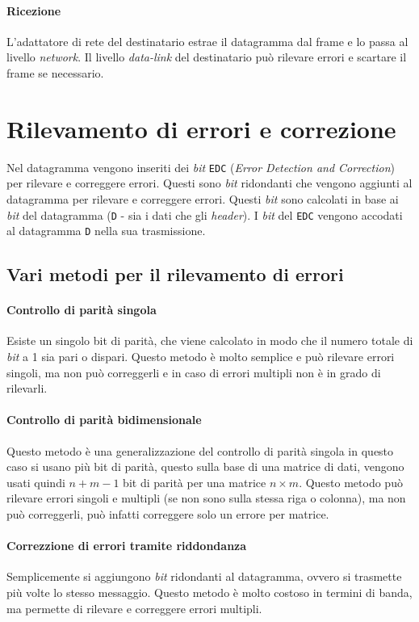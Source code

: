         \paragraph{Ricezione} L'adattatore di rete del destinatario estrae il datagramma dal frame e lo passa al livello \textit{network}. Il livello \textit{data-link} del destinatario può rilevare errori e scartare il frame se necessario.
\section{Rilevamento di errori e correzione}
    Nel datagramma vengono inseriti dei \textit{bit} \texttt{EDC} (\textit{Error Detection and Correction}) per rilevare e correggere errori. Questi sono \textit{bit} ridondanti che vengono aggiunti al datagramma per rilevare e correggere errori. Questi \textit{bit} sono calcolati in base ai \textit{bit} del datagramma (\texttt{D} - sia i dati che gli \textit{header}). I \textit{bit} del \texttt{EDC} vengono accodati al datagramma \texttt{D} nella sua trasmissione.

    \subsection{Vari metodi per il rilevamento di errori}
        \paragraph{Controllo di parità singola} Esiste un singolo bit di parità, che viene calcolato in modo che il numero totale di \textit{bit} a 1 sia pari o dispari. Questo metodo è molto semplice e può rilevare errori singoli, ma non può correggerli e in caso di errori multipli non è in grado di rilevarli.
        \paragraph{Controllo di parità bidimensionale} Questo metodo è una generalizzazione del controllo di parità singola in questo caso si usano più bit di parità, questo sulla base di una matrice di dati, vengono usati quindi $n+m-1$ bit di parità per una matrice $n \times m$. Questo metodo può rilevare errori singoli e multipli (se non sono sulla stessa riga o colonna), ma non può correggerli, può infatti correggere solo un errore per matrice.
        \paragraph{Correzzione di errori tramite riddondanza} Semplicemente si aggiungono \textit{bit} ridondanti al datagramma, ovvero si trasmette più volte lo stesso messaggio. Questo metodo è molto costoso in termini di banda, ma permette di rilevare e correggere errori multipli.
    
